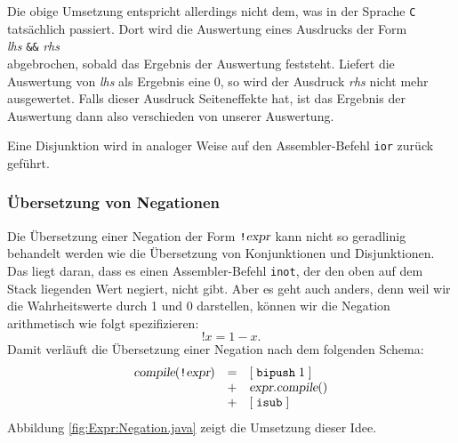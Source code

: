 Die obige Umsetzung entspricht allerdings nicht dem, was in der Sprache \texttt{C}
tats\"achlich passiert.  Dort wird die Auswertung eines Ausdrucks der Form 
\\[0.2cm]
\hspace*{1.3cm}
\textsl{lhs} \texttt{\&\&} \textsl{rhs}
\\[0.2cm]
abgebrochen, sobald das Ergebnis der Auswertung feststeht.  Liefert die Auswertung
von \textsl{lhs} als Ergebnis eine $0$, so wird der Ausdruck \textsl{rhs} nicht mehr
ausgewertet.  Falls dieser Ausdruck Seiteneffekte hat, ist das Ergebnis der Auswertung dann
also verschieden von unserer Auswertung.

Eine Disjunktion wird in analoger Weise auf den Assembler-Befehl \texttt{ior} zur\"uck gef\"uhrt.

\subsubsection{\"Ubersetzung von Negationen}
Die \"Ubersetzung einer Negation der Form $\texttt{!}\textsl{expr}$ kann nicht so geradlinig behandelt
werden wie die \"Ubersetzung von Konjunktionen und Disjunktionen.  Das liegt daran, dass es einen
Assembler-Befehl \texttt{inot}, der den oben auf dem Stack liegenden Wert negiert, nicht gibt.
Aber es geht auch anders, denn weil wir die Wahrheitswerte durch 1 und 0 darstellen, k\"onnen wir die
Negation arithmetisch wie folgt spezifizieren:
\[ \texttt{!}x = 1 - x. \]
Damit verl\"auft die \"Ubersetzung einer Negation nach dem folgenden Schema:
\[
   \begin{array}[t]{lcl}
   \textsl{compile}(\texttt{!}\textsl{expr}) & = & 
         [\;\texttt{bipush}\;1\;]  \\
   & + & \textsl{expr}.\textsl{compile}()  \\
   & + & [\;\texttt{isub}\;]  
\end{array}
\]
Abbildung \ref{fig:Expr:Negation.java} zeigt die Umsetzung dieser Idee.

